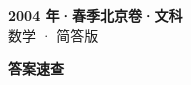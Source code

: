 \documentclass[zihao=-4, a4paper]{ctexart}
\begin{document}
\begin{center}
  {\Large\bfseries 2004 年·春季北京卷·文科}\\[4pt]
  {\large 数学 · 简答版}
\end{center}
\medskip
{}

\clearpage
{}
\begin{center}{\Large\bfseries 答案速查}\end{center}
\medskip

\end{document}
